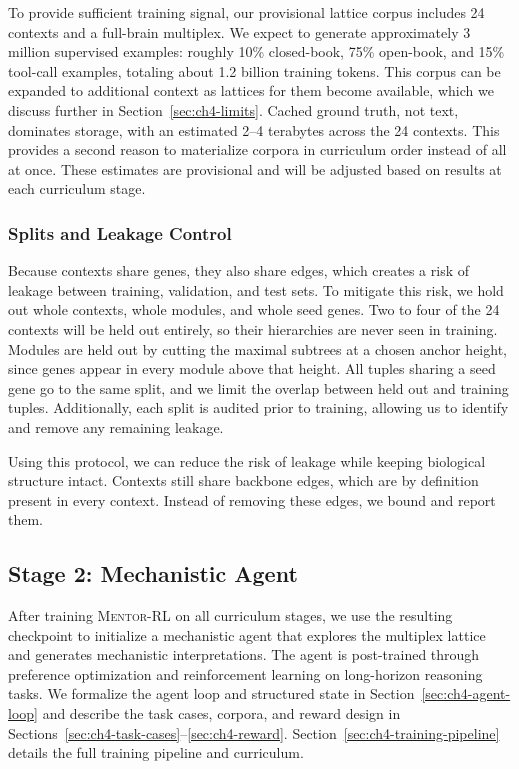 \documentclass[thesis,letterpaper,12pt]{utthesis}
\begin{document}
To provide sufficient training signal, our provisional lattice corpus includes 24 contexts and a full-brain multiplex. We expect to generate approximately 3 million supervised examples: roughly 10\% closed-book, 75\% open-book, and 15\% tool-call examples, totaling about 1.2 billion training tokens. This corpus can be expanded to additional context as lattices for them become available, which we discuss further in Section~\ref{sec:ch4-limits}. Cached ground truth, not text, dominates storage, with an estimated 2--4 terabytes across the 24 contexts. This provides a second reason to materialize corpora in curriculum order instead of all at once. These estimates are provisional and will be adjusted based on results at each curriculum stage.

\subsubsection{Splits and Leakage Control}\label{sec:ch4-splits}
Because contexts share genes, they also share edges, which creates a risk of leakage between training, validation, and test sets. To mitigate this risk, we hold out whole contexts, whole modules, and whole seed genes. Two to four of the 24 contexts will be held out entirely, so their hierarchies are never seen in training. Modules are held out by cutting the maximal subtrees at a chosen anchor height, since genes appear in every module above that height. All tuples sharing a seed gene go to the same split, and we limit the overlap between held out and training tuples. Additionally, each split is audited prior to training, allowing us to identify and remove any remaining leakage.

Using this protocol, we can reduce the risk of leakage while keeping biological structure intact. Contexts still share backbone edges, which are by definition present in every context. Instead of removing these edges, we bound and report them.

\subsection{Stage 2: Mechanistic Agent}\label{sec:ch4-stage2}
After training \textsc{Mentor-RL} on all curriculum stages, we use the resulting checkpoint to initialize a mechanistic agent that explores the multiplex lattice and generates mechanistic interpretations. The agent is post-trained through preference optimization and reinforcement learning on long-horizon reasoning tasks. We formalize the agent loop and structured state in Section~\ref{sec:ch4-agent-loop} and describe the task cases, corpora, and reward design in Sections~\ref{sec:ch4-task-cases}--\ref{sec:ch4-reward}. Section~\ref{sec:ch4-training-pipeline} details the full training pipeline and curriculum.
\end{document}

